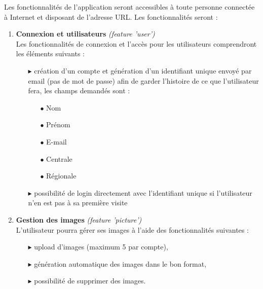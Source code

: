 \documentclass{article}
\begin{document}
\begin{sffamily}
Les fonctionnalités de l'application seront accessibles à toute personne connectée à Internet et disposant de l’adresse URL. Les fonctionnalités seront : 
\begin{enumerate}
\item \textbf{Connexion et utilisateurs} \textit{(feature 'user')}\\
Les fonctionnalités de connexion et l’accès pour les utilisateurs comprendront les éléments suivants :
\begin{itemize}
	\item[\hspace*{0.25cm}$\blacktriangleright$] création d'un compte et génération d'un identifiant unique envoyé par email (pas de mot de passe) afin de garder l'histoire 
	de ce que l'utilisateur fera, les champs demandés sont :
	\begin{itemize}
		\item[\hspace*{0.25cm}$\bullet$]{Nom}
		\item[\hspace*{0.25cm}$\bullet$]{Prénom}
		\item[\hspace*{0.25cm}$\bullet$]{E-mail}
		\item[\hspace*{0.25cm}$\bullet$]{Centrale}
		\item[\hspace*{0.25cm}$\bullet$]{Régionale}
	\end{itemize}
	\item[\hspace*{0.25cm}$\blacktriangleright$] possibilité de login directement avec l'identifiant unique si l'utilisateur n'en est pas à sa première visite \\
\end{itemize}
\item \textbf{Gestion des images} \textit{(feature 'picture')}\\
L'utilisateur pourra gérer ses images à l'aide des fonctionnalités suivantes :
\begin{itemize}
	\item[\hspace*{0.25cm}$\blacktriangleright$] upload d'images (maximum 5 par compte),
	\item[\hspace*{0.25cm}$\blacktriangleright$] génération automatique des images dans le bon format,
	\item[\hspace*{0.25cm}$\blacktriangleright$] possibilité de supprimer des images.\\

\end{itemize}
\end{enumerate}
\end{sffamily}
\end{document}
